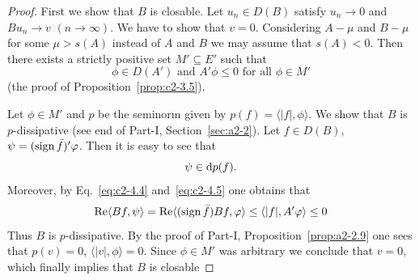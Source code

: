 \begin{proof}
First we show that $B$ is closable.
Let $u_{n} \in D(B)$ satisfy $u_{n} \to 0$ and $Bu_{n} \to v$ $(n \to \infty)$.
We have to
show that $v = 0$. 
Considering $A - \mu$ and $B - \mu$ for some $\mu > s(A)$ instead of\/ $A$ and $B$ we may assume that $s(A) < 0$. 
Then there exists a strictly positive set $M' \subseteq E'$ such that
\begin{equation}\label{eq:c2-4.5}
\phi \in D(A') \text{ and } A'\phi \leq 0 \text{ for all } \phi \in M'
\end{equation}
(\cf the proof of Proposition~\ref{prop:c2-3.5}).

Let $\phi \in M'$ and $p$ be the seminorm given by $p(f) = \langle|f|,\phi\rangle$. 
We show that $B$ is $p$-dissipative (see end of Part-I, Section~\ref{sec:a2-2}).
Let $f \in D(B)$, $\psi = (\sign  \bar{f})'\phi$. 
Then it is easy to see that 
\[
\psi \in \mathop{}\!\mathrm{d}{p}(f) .
\]
Moreover, by Eq.~\eqref{eq:c2-4.4} and~\eqref{eq:c2-4.5} one obtains that 
\[
\Re\langle Bf,\psi\rangle = \Re\langle(\sign  \bar{f})Bf,\phi\rangle \leq \langle|f|,A'\phi\rangle \leq 0
\]
Thus $B$ is $p$-dissipative. 
By the proof of Part-I, Proposition~\ref{prop:a2-2.9} 
one sees that $p(v) = 0$, \ie $\langle|v|,\phi\rangle = 0$.
Since $\phi \in M'$ was arbitrary we conclude that $v = 0$, which finally implies that $B$ is closable


\end{proof}
